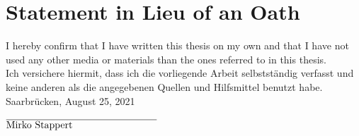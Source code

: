\chapter*{Statement in Lieu of an Oath}
I hereby confirm that I have written this thesis on my own and that I have not used any other media or materials than the ones referred to in this thesis.\\[0.5cm]
Ich versichere hiermit, dass ich die vorliegende Arbeit selbstst\"andig verfasst und keine anderen als die angegebenen Quellen und Hilfsmittel benutzt habe.\\[1.5cm]

\noindent Saarbr\"ucken, August 25, 2021
\begin{flushright}
  $\overline{\mbox{Mirko Stappert}\makebox[3cm]{}}$
\end{flushright}

